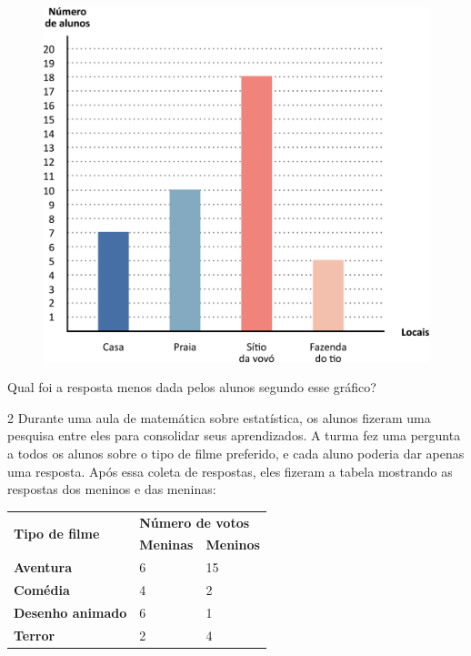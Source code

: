 \begin{figure}[htpb!]
\centering
\includegraphics[width=\textwidth]{./media/image79.png}
\end{figure}

\noindent{}Qual foi a resposta menos dada pelos alunos segundo esse gráfico?
\enlargethispage{2\baselineskip}


\num{2} Durante uma aula de matemática sobre estatística, os alunos fizeram uma
pesquisa entre eles para consolidar seus aprendizados. A turma fez uma
pergunta a todos os alunos sobre o tipo de filme preferido, e cada aluno
poderia dar apenas uma resposta. Após essa coleta de respostas, eles
fizeram a tabela mostrando as respostas dos meninos e das
meninas:

\begin{center}
\begin{tabular}{l|ll}
\hline
\multirow{2}{*}{\textbf{Tipo de filme}} & \multicolumn{2}{l}{\textbf{Número de votos}} \\ \cline{2-3} 
 & \multicolumn{1}{l|}{\textbf{Meninas}} & \textbf{Meninos} \\ \hline
\textbf{Aventura} & \multicolumn{1}{l|}{6} & 15 \\ \hline
\textbf{Comédia} & \multicolumn{1}{l|}{4} & 2 \\ \hline
\textbf{Desenho animado} & \multicolumn{1}{l|}{6} & 1 \\ \hline
\textbf{Terror} & \multicolumn{1}{l|}{2} & 4 \\ \hline
\end{tabular}
\end{center}

